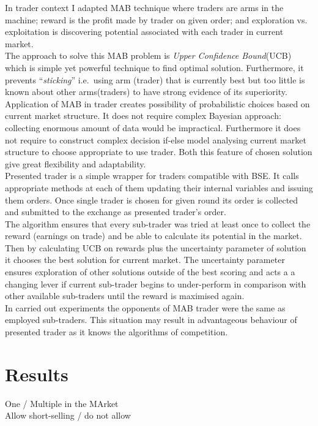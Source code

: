 \documentclass{llncs}
\begin{document}
In trader context I adapted MAB technique where traders are arms in the machine; reward is the profit made by trader on given order; and exploration vs. exploitation is discovering potential associated with each trader in current market.\\
The approach to solve this MAB problem is \emph{Upper Confidence Bound}(UCB)~\cite{white2012bandit} which is simple yet powerful technique to find optimal solution. Furthermore, it prevents ``\emph{sticking}'' i.e.\ using arm (trader) that is currently best but too little is known about other arms(traders) to  have strong evidence of its superiority.\\

Application of MAB in trader creates possibility of probabilistic choices based on current market structure. It does not require complex Bayesian approach: collecting enormous amount of data would be impractical. Furthermore it does not require to construct complex decision if-else model analysing current market structure to choose appropriate to use trader. Both this feature of chosen solution give great flexibility and adaptability.\\

Presented trader is a simple wrapper for traders compatible with BSE. It calls appropriate methods at each of them updating their internal variables and issuing them orders. Once single trader is chosen for given round its order is collected and submitted to the exchange as presented trader's order.\\
The algorithm ensures that every sub-trader was tried at least once to collect the reward (earnings on trade) and be able to calculate its potential in the market. Then by calculating UCB on rewards plus the uncertainty parameter of solution it chooses the best solution for current market. The uncertainty parameter ensures exploration of other solutions outside of the best scoring and acts a a changing lever if current sub-trader begins to under-perform in comparison with other available sub-traders until the reward is maximised again.\\

In carried out experiments the opponents of MAB trader were the same as employed sub-traders. This situation may result in advantageous behaviour of presented trader as it knows the algorithms of competition.

\section{Results}
One / Multiple in the MArket\\
Allow short-selling / do not allow\\
\end{document}
